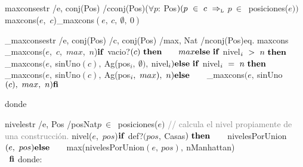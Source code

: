 
\vspace{4mm}
\tadOperacion
{maxcons}{estr /e, conj(Pos) /c}{conj(Pos)}{($\forall p:\ $Pos$)(p\ \in\ c\ \Rightarrow_{\mathrm{\scriptscriptstyle{L}}}$ $p\ \in\ $ posiciones($e))$}
\tadAxioma
{maxcons($e$,\ $c$)}{$
    $\_maxcons$(e,\ c,\ \emptyset,\ 0)
$}


\vspace{4mm}
\tadOperacion
{\_maxcons}{estr /e, conj(Pos) /c, conj(Pos) /max, Nat /n}{conj(Pos)}{eq. maxcons}          
\tadAxioma
{\_maxcons($e$,\ $c$,\ $max$,\ $n$)}{$
    \LIF\ $vacio?$(c)\ \LTHEN\ \\  
    \tab max \\
    \LELSE\ \LIF\ $nivel$_i\ >\ n\ \LTHEN\ \\ 
    \tab $\_maxcons$(e,\ $sinUno$(c),\ $Ag(pos$_i,\ \emptyset),\ $nivel$_i) \\
    \textrm{\textbf{else}}\ \textrm{\textbf{if}}\ $nivel$_i\ =\ n\ \LTHEN\ \\ 
    \tab $\_maxcons$(e,\ $sinUno$(c),\ $Ag(pos$_i,\ max),\ n) \\
    \textrm{\textbf{else}}\ \\
    \hspace*{7mm} $\_maxcons$(e,\ $sinUno$(c),\ max,\ n) \\
    \textrm{\textbf{fi}}  
$}


donde
\tadNoAlinearAxiomas
    
\vspace{4mm}
\tadOperacion
{nivel}{estr /e, Pos /pos}{Nat}{$p\ \in\ $ posiciones($e)$}%
\textcolor{gray}{// calcula el nivel propiamente de una construcción.}
\tadAxioma
{nivel($e$,\ $pos$)}{$
    \LIF\ $def?$(pos,\ $Casas$)\ \textrm{\textbf{then}}\ \\
    \hspace*{7mm} $nivelesPorUnion$(e,\ pos) \\
    \textrm{\textbf{else}} \\ 
    \hspace*{7mm} $max(nivelesPorUnion$(e,\ pos),\ $nManhattan)\\\
    $\textrm{\textbf{fi}}$
}
donde:
\tadNoAlinearAxiomas


